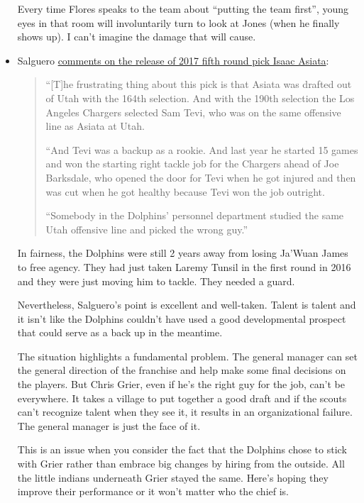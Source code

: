 \documentclass[11pt]{article}
\begin{document}
\begin{itemize}
Every time Flores speaks to the team about ``putting the team first'', young eyes in that room will involuntarily turn to look at Jones (when he finally shows up).  I can't imagine the damage that will cause.

\item Salguero \href{https://www.miamiherald.com/sports/spt-columns-blogs/armando-salguero/article230468024.html}{comments on the release of 2017 fifth round pick Isaac Asiata}:  

\begin{quote}
``[T]he frustrating thing about this pick is that Asiata was drafted out of Utah with the 164th selection. And with the 190th selection the Los Angeles Chargers selected Sam Tevi, who was on the same offensive line as Asiata at Utah.

``And Tevi was a backup as a rookie. And last year he started 15 games and won the starting right tackle job for the Chargers ahead of Joe Barksdale, who opened the door for Tevi when he got injured and then was cut when he got healthy because Tevi won the job outright.

``Somebody in the Dolphins’ personnel department studied the same Utah offensive line and picked the wrong guy.''
\end{quote}

In fairness, the Dolphins were still 2 years away from losing Ja'Wuan James to free agency.  They had just taken Laremy Tunsil in the first round in 2016 and they were just moving him to tackle.  They needed a guard.

Nevertheless, Salguero's point is excellent and well-taken.  Talent is talent and it isn't like the Dolphins couldn't have used a good developmental prospect that could serve as a back up in the meantime.

The situation highlights a fundamental problem.  The general manager can set the general direction of the franchise and help make some final decisions on the players.  But Chris Grier, even if he's the right guy for the job, can't be everywhere.  It takes a village to put together a good draft and if the scouts can't recognize talent when they see it, it results in an organizational failure.  The general manager is just the face of it.

This is an issue when you consider the fact that the Dolphins chose to stick with Grier rather than embrace big changes by hiring from the outside.  All the little indians underneath Grier stayed the same.  Here's hoping they improve their performance or it won't matter who the chief is.



\end{itemize}
\end{document}
